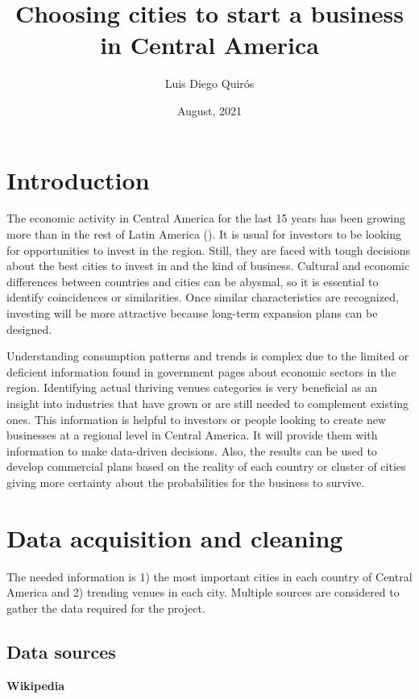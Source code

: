 \documentclass[letterpaper,12pt]{article}
\title{Choosing cities to start a business in Central America}
\author{Luis Diego Quirós}
\date{August, 2021}
\begin{document}
\maketitle

\section{Introduction}

The economic activity in Central America for the last 15 years has been growing more than in the rest of Latin America (\cite{cadena_strengthening_2019}). It is usual for investors to be looking for opportunities to invest in the region. Still, they are faced with tough decisions about the best cities to invest in and the kind of business. Cultural and economic differences between countries and cities can be abysmal, so it is essential to identify coincidences or similarities. Once similar characteristics are recognized, investing will be more attractive because long-term expansion plans can be designed.

Understanding consumption patterns and trends is complex due to the limited or deficient information found in government pages about economic sectors in the region. Identifying actual thriving venues categories is very beneficial as an insight into industries that have grown or are still needed to complement existing ones. This information is helpful to investors or people looking to create new businesses at a regional level in Central America. It will provide them with information to make data-driven decisions. Also, the results can be used to develop commercial plans based on the reality of each country or cluster of cities giving more certainty about the probabilities for the business to survive.

\section{Data acquisition and cleaning}

The needed information is 1) the most important cities in each country of Central America and 2) trending venues in each city. Multiple sources are considered to gather the data required for the project.

\subsection{Data sources}

\textbf{Wikipedia}
\end{document}
